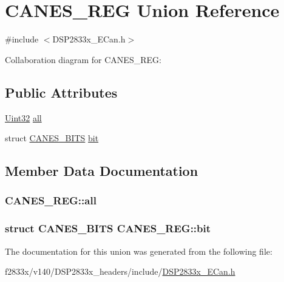 \hypertarget{union_c_a_n_e_s___r_e_g}{}\section{C\+A\+N\+E\+S\+\_\+\+R\+E\+G Union Reference}
\label{union_c_a_n_e_s___r_e_g}


{\ttfamily \#include $<$D\+S\+P2833x\+\_\+\+E\+Can.\+h$>$}



Collaboration diagram for C\+A\+N\+E\+S\+\_\+\+R\+E\+G\+:
\subsection*{Public Attributes}
\begin{DoxyCompactItemize}
\item 
\hyperlink{_d_s_p2833x___device_8h_aba99025e657f892beb7ff31cecf64653}{Uint32} \hyperlink{union_c_a_n_e_s___r_e_g_a8087a9cfc8749b3cb249f8f064c1f6e2}{all}
\item 
struct \hyperlink{struct_c_a_n_e_s___b_i_t_s}{C\+A\+N\+E\+S\+\_\+\+B\+I\+T\+S} \hyperlink{union_c_a_n_e_s___r_e_g_ac046d616b1d36705477e4987a48a152b}{bit}
\end{DoxyCompactItemize}


\subsection{Member Data Documentation}
\hypertarget{union_c_a_n_e_s___r_e_g_a8087a9cfc8749b3cb249f8f064c1f6e2}{}
\subsubsection[{all}]{ C\+A\+N\+E\+S\+\_\+\+R\+E\+G\+::all}\label{union_c_a_n_e_s___r_e_g_a8087a9cfc8749b3cb249f8f064c1f6e2}
\hypertarget{union_c_a_n_e_s___r_e_g_ac046d616b1d36705477e4987a48a152b}{}
\subsubsection[{bit}]{\setlength{\rightskip}{0pt plus 5cm}struct {\bf C\+A\+N\+E\+S\+\_\+\+B\+I\+T\+S} C\+A\+N\+E\+S\+\_\+\+R\+E\+G\+::bit}\label{union_c_a_n_e_s___r_e_g_ac046d616b1d36705477e4987a48a152b}


The documentation for this union was generated from the following file\+:\begin{DoxyCompactItemize}
\item 
f2833x/v140/\+D\+S\+P2833x\+\_\+headers/include/\hyperlink{_d_s_p2833x___e_can_8h}{D\+S\+P2833x\+\_\+\+E\+Can.\+h}\end{DoxyCompactItemize}
